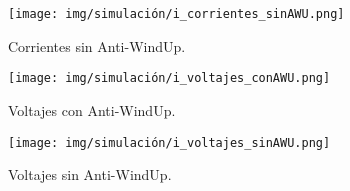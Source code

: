 \begin{figure}[H]
    \centering
    \texttt{[image: img/simulación/i\_corrientes\_sinAWU.png]}
    \caption{Corrientes sin Anti-WindUp.}
    \label{fig:i_corrientes_sinAWU}
\end{figure}

\begin{figure}[H]
    \centering
    \texttt{[image: img/simulación/i\_voltajes\_conAWU.png]}
    \caption{Voltajes con Anti-WindUp.}
    \label{fig:i_voltajes_conAWU}
\end{figure}

\begin{figure}[H]
    \centering
    \texttt{[image: img/simulación/i\_voltajes\_sinAWU.png]}
    \caption{Voltajes sin Anti-WindUp.}
    \label{fig:i_voltajes_sinAWU}
\end{figure}

\newpage